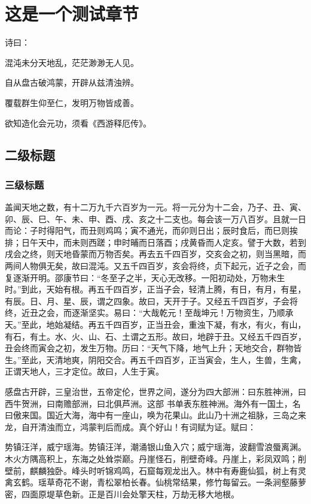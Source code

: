 \chapter{这是一个测试章节}

诗曰：

混沌未分天地乱，茫茫渺渺无人见。

自从盘古破鸿蒙，开辟从兹清浊辨。

覆载群生仰至仁，发明万物皆成善。

欲知造化会元功，须看《西游释厄传》。

\section{二级标题}

\subsection{三级标题}

盖闻天地之数，有十二万九千六百岁为一元。将一元分为十二会，乃子、丑、寅、卯、辰、巳、午、未、申、酉、戌、亥之十二支也。每会该一万八百岁。且就一日而论：子时得阳气，而丑则鸡鸣；寅不通光，而卯则日出；辰时食后，而巳则挨排；日午天中，而未则西蹉；申时晡而日落酉；戌黄昏而人定亥。譬于大数，若到戌会之终，则天地昏蒙而万物否矣。再去五千四百岁，交亥会之初，则当黑暗，而两间人物俱无矣，故曰混沌。又五千四百岁，亥会将终，贞下起元，近子之会，而复逐渐开明。邵康节曰：``冬至子之半，天心无改移。一阳初动处，万物未生时。''到此，天始有根。再五千四百岁，正当子会，轻清上腾，有日，有月，有星，有辰。日、月、星、辰，谓之四象。故曰，天开于子。又经五千四百岁，子会将终，近丑之会，而逐渐坚实。易曰：``大哉乾元！至哉坤元！万物资生，乃顺承天。''至此，地始凝结。再五千四百岁，正当丑会，重浊下凝，有水，有火，有山，有石，有土。水、火、山、石、土谓之五形。故曰，地辟于丑。又经五千四百岁，丑会终而寅会之初，发生万物。历曰：“天气下降，地气上升；天地交合，群物皆生。”至此，天清地爽，阴阳交合。再五千四百岁，正当寅会，生人，生兽，生禽，正谓天地人，三才定位。故曰，人生于寅。 

感盘古开辟，三皇治世，五帝定伦，世界之间，遂分为四大部洲：曰东胜神洲，曰西牛贺洲，曰南赡部洲，曰北俱芦洲。这部 书单表东胜神洲。海外有一国土，名曰傲来国。国近大海，海中有一座山，唤为花果山。此山乃十洲之祖脉，三岛之来龙，自开清浊而立，鸿蒙判后而成。真个好山！有词赋为证。赋曰：

势镇汪洋，威宁瑶海。势镇汪洋，潮涌银山鱼入穴；威宁瑶海，波翻雪浪蜃离渊。木火方隅高积上，东海之处耸崇巅。丹崖怪石，削壁奇峰。丹崖上，彩凤双鸣；削壁前，麒麟独卧。峰头时听锦鸡鸣，石窟每观龙出入。林中有寿鹿仙狐，树上有灵禽玄鹤。瑶草奇花不谢，青松翠柏长春。仙桃常结果，修竹每留云。一条涧壑藤萝密，四面原堤草色新。正是百川会处擎天柱，万劫无移大地根。


